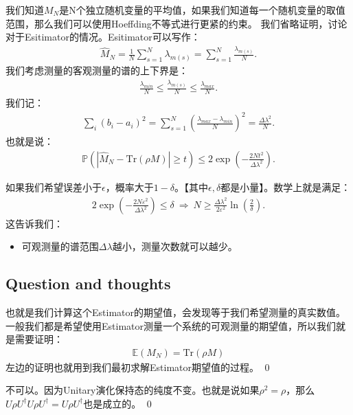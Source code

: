 \bigskip
{}

我们知道$ M_N $是N个独立随机变量的平均值，如果我们知道每一个随机变量的取值范围，那么我们可以使用Hoeffding不等式进行更紧的约束。
我们省略证明，讨论对于Esitimator的情况。Esitimator可以写作：
\begin{align}
  \hat{M}_N=\frac{1}{N}\sum_{s=1}^N\lambda_{m(s)}=\sum_{s=1}^N\frac{\lambda_{m(s)}}{N}.
\end{align}
我们考虑测量的客观测量的谱的上下界是：
\begin{align}
  \frac{\lambda_{min}}{N}\leq\frac{\lambda_{m(s)}}{N}\leq\frac{\lambda_{max}}{N}.
\end{align}
我们记：
\begin{align}
  \sum_i(b_i-a_i)^2=\sum_{s=1}^N\left(\frac{\lambda_{max}-\lambda_{min}}{N}\right)^2=\frac{\Delta\lambda^2}{N}.
\end{align}
也就是说：
\begin{align}
  \mathbb{P}{\left(\left|\hat{M}_N-\mathrm{Tr}(\rho M)\right|\geq
  t\right)}\leq2\exp{\left(-\frac{2Nt^2}{\Delta\lambda^2}\right)}.
\end{align}

如果我们希望误差小于$ \epsilon $，概率大于$ 1-\delta $。【其中$ \epsilon, \delta $都是小量】。数学上就是满足：
\begin{align}
  2\exp\left(-\frac{2N\varepsilon^2}{\Delta\lambda^2}\right)\leq\delta\mathrm{~}\Longrightarrow\mathrm{~}N\geq\frac{\Delta\lambda^2}{2\varepsilon^2}\ln\left(\frac{2}{\delta}\right).
\end{align}
这告诉我们：
\begin{itemize}
  \item 可观测量的谱范围$ \Delta \lambda $越小，测量次数就可以越少。
\end{itemize}

\subsection{Question and thoughts}


也就是我们计算这个Estimator的期望值，会发现等于我们希望测量的真实数值。一般我们都是希望使用Estimator测量一个系统的可观测量的期望值，所以我们就是需要证明：
\begin{align}
  \mathbb{E}(M_N)=\mathrm{Tr}(\rho M)
\end{align}
左边的证明也就用到我们最初求解Estimator期望值的过程。
\qed

不可以。因为Unitary演化保持态的纯度不变。也就是说如果$ \rho^2=\rho $，那么$ U\rho U^\dagger
U\rho U^\dagger=U\rho U^\dagger $也是成立的。
\qed
